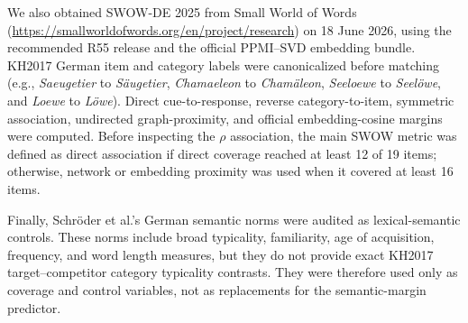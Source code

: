 We also obtained SWOW-DE 2025 from Small World of Words (\url{https://smallworldofwords.org/en/project/research}) on 18 June 2026, using the recommended R55 release and the official PPMI--SVD embedding bundle. KH2017 German item and category labels were canonicalized before matching (e.g., \emph{Saeugetier} to \emph{Säugetier}, \emph{Chamaeleon} to \emph{Chamäleon}, \emph{Seeloewe} to \emph{Seelöwe}, and \emph{Loewe} to \emph{Löwe}). Direct cue-to-response, reverse category-to-item, symmetric association, undirected graph-proximity, and official embedding-cosine margins were computed. Before inspecting the $\rho$ association, the main SWOW metric was defined as direct association if direct coverage reached at least 12 of 19 items; otherwise, network or embedding proximity was used when it covered at least 16 items.

Finally, Schröder et al.'s German semantic norms were audited as lexical-semantic controls. These norms include broad typicality, familiarity, age of acquisition, frequency, and word length measures, but they do not provide exact KH2017 target--competitor category typicality contrasts. They were therefore used only as coverage and control variables, not as replacements for the semantic-margin predictor.

